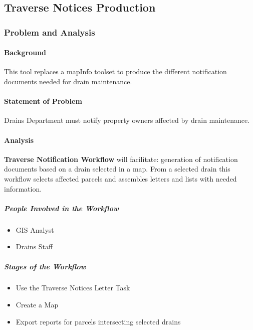 %
%
%
 \def\titlename{Traverse Notices}
 \def\authorName{Allegan County GIS Services}
 \def\pdfTitle{Traverse Notices}
 \def\pdfSubject{GIS Tools} %
 \def\pdfKeywords{drains,gis}

 
\subsection{Traverse Notices Production}
\subsubsection{Problem and Analysis}
\begin{adjmulticols}{2}{\innerMar}{\outerMar}
\paragraph{Background}
\noindent This tool replaces a mapInfo toolset to produce the different notification documents needed for drain maintenance.
\paragraph{Statement of Problem}
\noindent Drains Department must notify property owners affected by drain maintenance. 
\paragraph{Analysis}
\noindent \textbf{Traverse Notification Workflow} will facilitate: generation of notification documents based on a drain selected in a map.  From a selected drain this workflow selects affected parcels and assembles letters and lists with needed information.
\subparagraph{People Involved in the Workflow}
\begin{itemize} %
\item GIS Analyst
\item Drains Staff
\end{itemize} %
\subparagraph*{Stages of the Workflow}
\begin{itemize} %
\item Use the Traverse Notices Letter Task
\item Create a Map
\item Export reports for parcels intersecting selected drains
\end{itemize} %
\end{adjmulticols}
\clearpage
